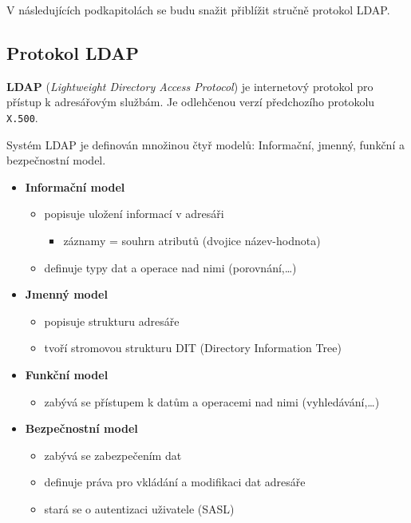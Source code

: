 \documentclass[a4paper, 11pt]{article}
\begin{document}
V následujících podkapitolách se budu snažit přiblížit stručně protokol LDAP.

\subsection{Protokol LDAP}

\textbf{LDAP} (\textit{Lightweight Directory Access Protocol}) je internetový protokol pro přístup k adresářovým službám. Je odlehčenou verzí předchozího protokolu \texttt{X.500}.

Systém LDAP je definován množinou čtyř modelů: Informační, jmenný, funkční a bezpečnostní model. 

\begin{itemize}
	\item \textbf{Informační model}
	\begin{itemize}
		\item popisuje uložení informací v adresáři
		\begin{itemize}
			\item záznamy = souhrn atributů (dvojice název-hodnota)
		\end{itemize}
		\item definuje typy dat a operace nad nimi (porovnání,\dots)
	\end{itemize}

	\item \textbf{Jmenný model}
	\begin{itemize}
		\item popisuje strukturu adresáře
		\item tvoří stromovou strukturu DIT (Directory Information Tree)
	\end{itemize}
	
	\item \textbf{Funkční model}
	\begin{itemize}
		\item zabývá se přístupem k datům a operacemi nad nimi (vyhledávání,\dots)
	\end{itemize}

	\item \textbf{Bezpečnostní model}
	\begin{itemize}
		\item zabývá se zabezpečením dat
		\item definuje práva pro vkládání a modifikaci dat adresáře
		\item stará se o autentizaci uživatele (SASL)
	\end{itemize}

\end{itemize}
\end{document}
